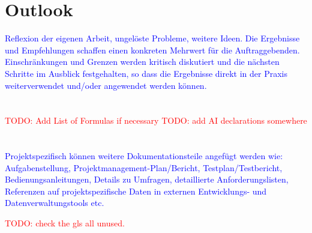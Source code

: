\documentclass[12pt, a4paper, oneside]{book}   	%
\renewcommand{\todo}[1]{\textcolor{red}{TODO: #1}}
\newcommand{\baaCriteria}[1]{\textcolor{blue}{#1}}
\begin{document}
	\chapter{Outlook}
		\baaCriteria{Reflexion der eigenen Arbeit, ungelöste Probleme, weitere Ideen.}
		\baaCriteria{Die Ergebnisse und Empfehlungen schaffen einen konkreten Mehrwert für die Auftraggebenden. Einschränkungen und Grenzen werden kritisch diskutiert und die nächsten Schritte im Ausblick festgehalten, so dass die Ergebnisse direkt in der Praxis weiterverwendet und/oder angewendet werden können.}
		
		\newpage




	\chapter{\glossaryname}
	\todo{Add List of Formulas if necessary}
	\todo{add AI declarations somewhere}
	
	
	\chapter{\bibname}
		\printbibliography[heading=none]
		
		
		
		\appendix
			\baaCriteria{Projektspezifisch können weitere Dokumentationsteile angefügt werden wie: Aufgabenstellung, Projektmanagement-Plan/Bericht, Testplan/Testbericht, Bedienungsanleitungen, Details zu Umfragen, detaillierte Anforderungslisten, Referenzen auf projektspezifische Daten in externen Entwicklungs- und Datenverwaltungstools etc.}
			
		\glsaddallunused                                %
		\todo{check the gls all unused.}
	
\end{document}
